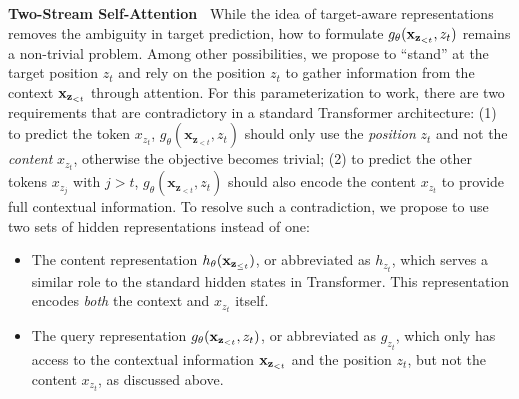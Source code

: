 \textbf{Two-Stream Self-Attention~}
While the idea of target-aware representations removes the ambiguity in target prediction, how to formulate $g_\theta({\mathbf{x}}_{{\mathbf{z}}_{<t}}, z_t)$ remains a non-trivial problem.
Among other possibilities, we propose to ``stand'' at the target position $z_t$ and rely on the position $z_t$ to gather information from the context ${\mathbf{x}}_{{\mathbf{z}}_{<t}}$ through attention.
For this parameterization to work, there are two requirements that are contradictory in a standard Transformer architecture: (1) to predict the token $x_{z_t}$, $g_\theta(\mathbf{x}_{\mathbf{z}_{<t}}, z_t)$ should only use the \textit{position} $z_t$ and not the \textit{content} $x_{z_t}$, otherwise the objective becomes trivial; (2) to predict the other tokens $x_{z_{j}}$ with $j > t$, $g_\theta(\mathbf{x}_{\mathbf{z}_{<t}}, z_t)$ should also encode the content $x_{z_t}$ to provide full contextual information.
To resolve such a contradiction, we propose to use two sets of hidden representations instead of one:
\begin{itemize}[leftmargin=*,topsep=0em,itemsep=0em]
\item The content representation $h_\theta({\mathbf{x}}_{{\mathbf{z}}_{\leq t}})$, or abbreviated as $h_{z_t}$, which serves a similar role to the standard hidden states in Transformer. This representation encodes \textit{both} the context and $x_{z_t}$ itself.
\item The query representation $g_\theta({\mathbf{x}}_{{\mathbf{z}}_{<t}}, z_t)$, or abbreviated as $g_{z_t}$, which only has access to the contextual information ${\mathbf{x}}_{{{\mathbf{z}}}_{<t}}$ and the position $z_t$, but not the content $x_{z_t}$, as discussed above.
\end{itemize}
